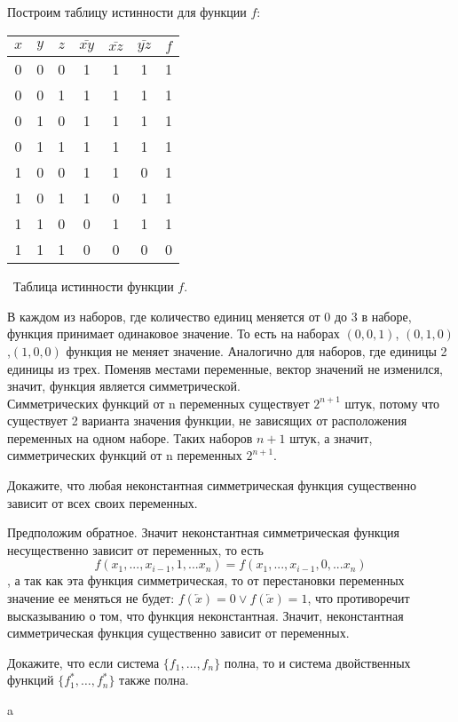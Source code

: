 \begin{solution}
Построим таблицу истинности для функции $f$:
\begin{center}
 \begin{tabular}{| c c c | c | c | c | c |}
  \hline	
 $x$ & $y$ & $z$ & $\bar{xy}$ & $\bar{xz}$ & $\bar{yz}$ & $f$ \T\B \\
  \hline\hline
  0 & 0 & 0 & 1 & 1 & 1 & 1 \T\B \\ 
  0 & 0 & 1 & 1 & 1 & 1 & 1 \B \\
  0 & 1 & 0 & 1 & 1 & 1 & 1 \B \\
  0 & 1 & 1 & 1 & 1 & 1 & 1 \B \\
  1 & 0 & 0 & 1 & 1 & 0 & 1 \B \\
  1 & 0 & 1 & 1 & 0 & 1 & 1\B \\
  1 & 1 & 0 & 0 & 1 & 1 & 1 \B \\
  1 & 1 & 1 & 0 & 0 & 0 & 0 \B \\
  \hline
 \end{tabular}
 \vspace{0,4 cm}
 
 \
 \small Таблица истинности функции $f$.
\end{center}

В каждом из наборов, где количество единиц меняется от 0 до 3 в наборе, функция принимает одинаковое значение. То есть на наборах $(0,0,1)$, $(0,1,0)$,$(1,0,0)$ функция не меняет значение. Аналогично для наборов, где единицы 2 единицы из трех. Поменяв местами переменные, вектор значений не изменился, значит, функция является симметрической.\\

Симметрических функций от n переменных существует $2^{n+1}$ штук, потому что существует 2 варианта значения функции, не зависящих от расположения переменных на одном наборе. Таких наборов $n+1$ штук, а значит, симметрических функций от n переменных $2^{n+1}$.
\end{solution}

\begin{exercise}
Докажите, что любая неконстантная симметрическая функция существенно зависит
от всех своих переменных.
\end{exercise}

\begin{solution}
Предположим обратное. Значит неконстантная симметрическая функция несущественно зависит от переменных, то есть
$$f(x_1,..., x_{i-1}, 1, ... x_n) = f(x_1,..., x_{i-1}, 0, ... x_n)$$, а так как эта функция симметрическая, то от перестановки переменных значение ее меняться не будет: $f(\overleftarrow{x})=0 \vee  f(\overleftarrow{x})=1$, что противоречит высказыванию о том, что функция неконстантная.  Значит, неконстантная симметрическая функция существенно зависит от переменных.
\end{solution}

\begin{exercise}
Докажите, что если система $\{f_1,\ldots,f_n\}$ полна, то и система
двойственных функций $\{f_1^*, \ldots, f_n^*\}$ также полна.
\end{exercise}

\begin{solution}
a
\end{solution}

